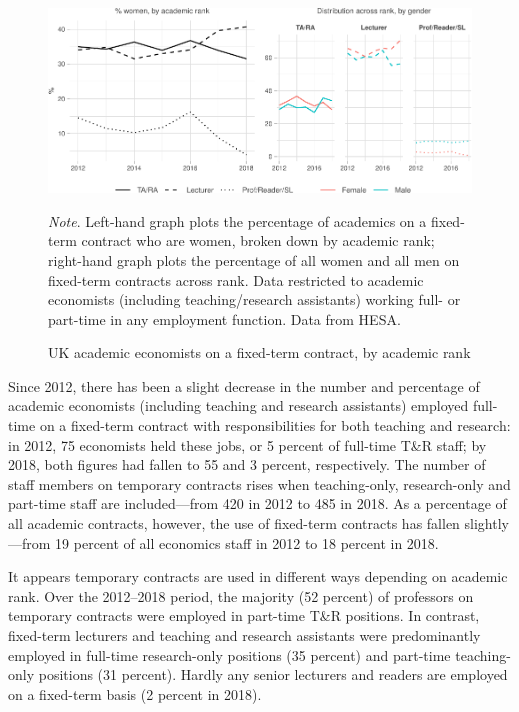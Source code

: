 \documentclass[a4paper, 1]{article}
\begin{document}
\begin{figure}
\centering
\includegraphics[width=\linewidth]{0-images/fixed-term-1.pdf}

\caption{UK academic economists on a fixed-term contract, by academic rank}
\label{fig:fixed-term}
\justify\footnotesize\textit{Note}.  Left-hand graph plots the percentage of academics on a fixed-term contract who are women, broken down by academic rank; right-hand graph plots the percentage of all women and all men on fixed-term contracts across rank. Data restricted to academic economists (including teaching/research assistants) working full- or part-time in any employment function. Data from HESA.
\end{figure}



Since 2012, there has been a slight decrease in the number and percentage of academic economists (including teaching and research assistants) employed full-time on a fixed-term contract with responsibilities for both teaching and research: in 2012, 75 economists held these jobs, or 5 percent of full-time T\&R staff; by 2018, both figures had fallen to 55 and 3 percent, respectively. The number of staff members on temporary contracts rises when teaching-only, research-only and part-time staff are included---from 420 in 2012 to 485 in 2018. As a percentage of all academic contracts, however, the use of fixed-term contracts has fallen slightly---from 19 percent of all economics staff in 2012 to 18 percent in 2018.

It appears temporary contracts are used in different ways depending on academic rank. Over the 2012--2018 period, the majority (52 percent) of professors on temporary contracts were employed in part-time T\&R positions. In contrast, fixed-term lecturers and teaching and research assistants were predominantly employed in full-time research-only positions (35 percent) and part-time teaching-only positions (31 percent). Hardly any senior lecturers and readers are employed on a fixed-term basis (2 percent in 2018).
\end{document}
